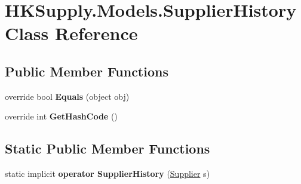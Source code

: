 \hypertarget{class_h_k_supply_1_1_models_1_1_supplier_history}{}\section{H\+K\+Supply.\+Models.\+Supplier\+History Class Reference}
\label{class_h_k_supply_1_1_models_1_1_supplier_history}
\subsection*{Public Member Functions}
\begin{DoxyCompactItemize}
\item 
\mbox{\label{class_h_k_supply_1_1_models_1_1_supplier_history_a8d2399aa38d8a0680878200b257b609d}} 
override bool {\bfseries Equals} (object obj)
\item 
\mbox{\label{class_h_k_supply_1_1_models_1_1_supplier_history_a51a4cb1261602017493e723c90b6b3f7}} 
override int {\bfseries Get\+Hash\+Code} ()
\end{DoxyCompactItemize}
\subsection*{Static Public Member Functions}
\begin{DoxyCompactItemize}
\item 
\mbox{\label{class_h_k_supply_1_1_models_1_1_supplier_history_a661b8838c54d3dfd38d5698cbb8eb204}} 
static implicit {\bfseries operator Supplier\+History} (\hyperlink{class_h_k_supply_1_1_models_1_1_supplier}{Supplier} s)
\end{DoxyCompactItemize}
